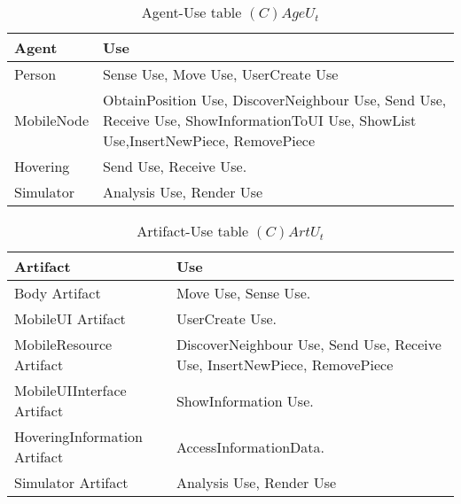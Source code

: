 \begin{table}[H]
	\centering
	\begin{tabular}{|p{4cm}|p{8cm}|}
			\hline
			\textbf{Agent} & \textbf{Use} \\
			\hline
			Person & Sense Use, Move Use, UserCreate Use\\
			\hline
      MobileNode & ObtainPosition Use, DiscoverNeighbour Use, Send Use, Receive Use,
      ShowInformationToUI Use, ShowList Use,InsertNewPiece, RemovePiece  \\
			\hline
			Hovering & Send Use, Receive Use. \\
			\hline
			Simulator & Analysis Use, Render Use \\
			\hline
		\end{tabular}
	\caption{Agent-Use table $(C)AgeU_t$}
	\label{tab:cageut}
\end{table}

\begin{table}[H]
	\centering
	\begin{tabular}{|p{4cm}|p{8cm}|}
			\hline
			\textbf{Artifact} & \textbf{Use} \\
			\hline
			Body Artifact & Move Use, Sense Use. \\
			\hline
			MobileUI Artifact & UserCreate Use. \\
			\hline
      MobileResource Artifact & DiscoverNeighbour Use, Send Use, Receive Use,
      InsertNewPiece, RemovePiece \\
			\hline
			MobileUIInterface Artifact & ShowInformation Use. \\
			\hline
			HoveringInformation Artifact & AccessInformationData. \\
			\hline
			Simulator Artifact & Analysis Use, Render Use \\
			\hline
		\end{tabular}
	\caption{Artifact-Use table $(C)ArtU_t$}
	\label{tab:cartut}
\end{table}

